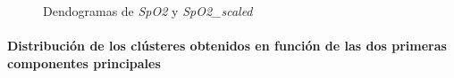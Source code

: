 \begin{figure}[ht]
    \centering
    \hfill
    \caption{Dendogramas de \textit{SpO2} y \textit{SpO2\_scaled}}\label{fig:raw_data_den_spo2}
\end{figure}

\paragraph{Distribución de los clústeres obtenidos en función de las dos primeras componentes principales}

